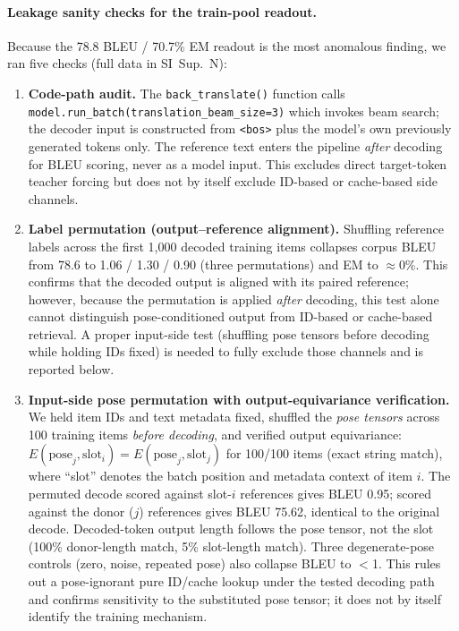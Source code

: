 \documentclass[pdflatex,sn-chicago]{sn-jnl}
\begin{document}
\paragraph{Leakage sanity checks for the train-pool readout.}
\label{sec:leakage_checks}
Because the 78.8 BLEU / 70.7\% EM readout is the most anomalous finding, we ran five checks (full data in SI~Sup.~N):
\begin{enumerate}\itemsep0pt
\item \textbf{Code-path audit.} The \texttt{back\_translate()} function calls \texttt{model.run\_batch(translation\_beam\_size=3)} which invokes beam search; the decoder input is constructed from \texttt{<bos>} plus the model's own previously generated tokens only. The reference text enters the pipeline \emph{after} decoding for BLEU scoring, never as a model input. This excludes direct target-token teacher forcing but does not by itself exclude ID-based or cache-based side channels.
\item \textbf{Label permutation (output--reference alignment).} Shuffling reference labels across the first 1{,}000 decoded training items collapses corpus BLEU from 78.6 to 1.06 / 1.30 / 0.90 (three permutations) and EM to $\approx$0\%. This confirms that the decoded output is aligned with its paired reference; however, because the permutation is applied \emph{after} decoding, this test alone cannot distinguish pose-conditioned output from ID-based or cache-based retrieval. A proper input-side test (shuffling pose tensors before decoding while holding IDs fixed) is needed to fully exclude those channels and is reported below.
\item \textbf{Input-side pose permutation with output-equivariance verification.} We held item IDs and text metadata fixed, shuffled the \emph{pose tensors} across 100 training items \emph{before decoding}, and verified output equivariance: $E(\text{pose}_j, \text{slot}_i) = E(\text{pose}_j, \text{slot}_j)$ for 100/100 items (exact string match), where ``slot'' denotes the batch position and metadata context of item $i$. The permuted decode scored against slot-$i$ references gives BLEU 0.95; scored against the donor ($j$) references gives BLEU 75.62, identical to the original decode. Decoded-token output length follows the pose tensor, not the slot (100\% donor-length match, 5\% slot-length match). Three degenerate-pose controls (zero, noise, repeated pose) also collapse BLEU to $<$1. This rules out a pose-ignorant pure ID/cache lookup under the tested decoding path and confirms sensitivity to the substituted pose tensor; it does not by itself identify the training mechanism.

\end{enumerate}
\end{document}
